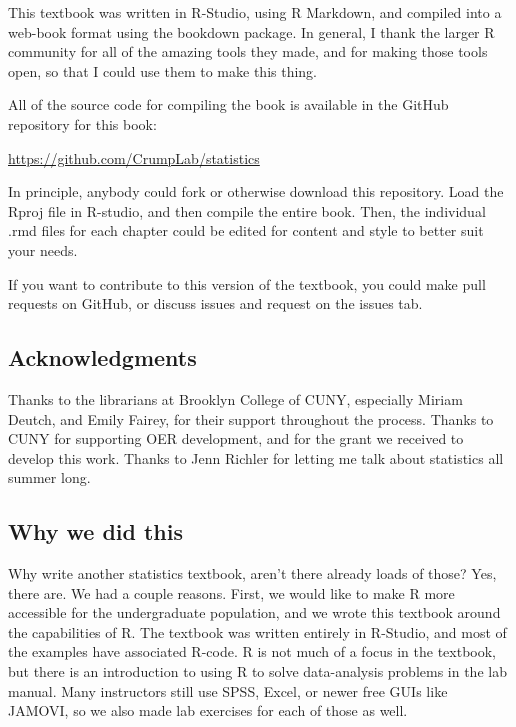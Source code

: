 \documentclass[]{book}
\begin{document}
This textbook was written in R-Studio, using R Markdown, and compiled into a web-book format using the bookdown package. In general, I thank the larger R community for all of the amazing tools they made, and for making those tools open, so that I could use them to make this thing.

All of the source code for compiling the book is available in the GitHub repository for this book:

\url{https://github.com/CrumpLab/statistics}

In principle, anybody could fork or otherwise download this repository. Load the Rproj file in R-studio, and then compile the entire book. Then, the individual .rmd files for each chapter could be edited for content and style to better suit your needs.

If you want to contribute to this version of the textbook, you could make pull requests on GitHub, or discuss issues and request on the issues tab.

\hypertarget{acknowledgments}{%
\subsection{Acknowledgments}\label{acknowledgments}}

Thanks to the librarians at Brooklyn College of CUNY, especially Miriam Deutch, and Emily Fairey, for their support throughout the process. Thanks to CUNY for supporting OER development, and for the grant we received to develop this work. Thanks to Jenn Richler for letting me talk about statistics all summer long.

\hypertarget{why-we-did-this}{%
\subsection{Why we did this}\label{why-we-did-this}}

Why write another statistics textbook, aren't there already loads of those? Yes, there are. We had a couple reasons. First, we would like to make R more accessible for the undergraduate population, and we wrote this textbook around the capabilities of R. The textbook was written entirely in R-Studio, and most of the examples have associated R-code. R is not much of a focus in the textbook, but there is an introduction to using R to solve data-analysis problems in the lab manual. Many instructors still use SPSS, Excel, or newer free GUIs like JAMOVI, so we also made lab exercises for each of those as well.
\end{document}
